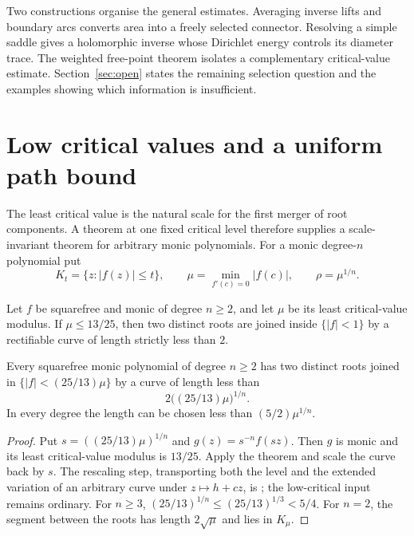 \documentclass[11pt]{article}
\begin{document}
Two constructions organise the general estimates.  Averaging inverse lifts
and boundary arcs converts area into a freely selected connector.  Resolving
a simple saddle gives a holomorphic inverse whose Dirichlet energy controls
its diameter trace.  The weighted free-point theorem isolates a complementary
critical-value estimate.  Section~\ref{sec:open} states the remaining
selection question and the examples showing which information is insufficient.

\section{Low critical values and a uniform path bound}
\label{sec:constant-factor}

The least critical value is the natural scale for the first merger of root
components.  A theorem at one fixed critical level therefore supplies a
scale-invariant theorem for arbitrary monic polynomials.  For a monic
degree-$n$ polynomial put
\[
 K_t=\{z:|f(z)|\le t\},\qquad
 \mu=\min_{f'(c)=0}|f(c)|,\qquad \rho=\mu^{1/n}.
\]

\begin{theorem}
\label{res:low-critical-thirteen-twentyfifths}
Let $f$ be squarefree and monic of degree $n\ge2$, and let $\mu$ be its least
critical-value modulus.  If $\mu\le13/25$, then two distinct roots are joined
inside $\{|f|<1\}$ by a rectifiable curve of length strictly less than $2$.
\end{theorem}

\begin{corollary}
\label{res:scaled-low-critical}
Every squarefree monic polynomial of degree $n\ge2$ has two distinct roots
joined in $\{|f|<(25/13)\mu\}$ by a curve of length less than
\[
 2\bigl((25/13)\mu\bigr)^{1/n}.
\]
In every degree the length can be chosen less than $(5/2)\mu^{1/n}$.
\end{corollary}

\begin{proof}
Put $s=((25/13)\mu)^{1/n}$ and $g(z)=s^{-n}f(sz)$.  Then $g$ is monic and
its least critical-value modulus is $13/25$.  Apply the theorem and scale the
curve back by $s$.  The rescaling step, transporting both the level and the
extended variation of an arbitrary curve under $z\mapsto h+cz$, is
; the low-critical input remains
ordinary.  For $n\ge3$,
$(25/13)^{1/n}\le(25/13)^{1/3}<5/4$.  For $n=2$, the segment between the
roots has length $2\sqrt\mu$ and lies in $K_\mu$.
\end{proof}
\end{document}
